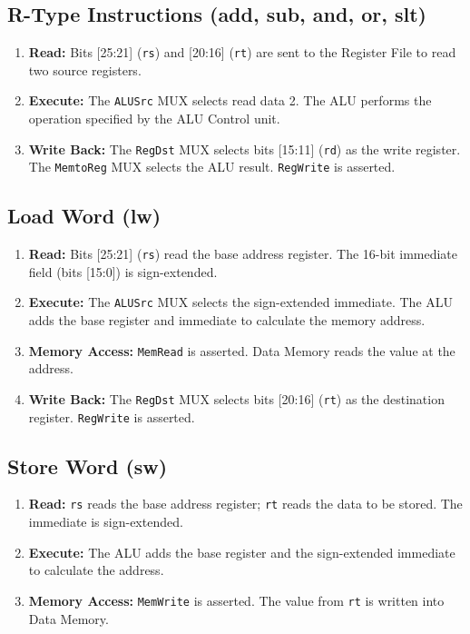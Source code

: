 \subsection{R-Type Instructions (add, sub, and, or, slt)}

\begin{enumerate}
    \item \textbf{Read:} Bits [25:21] (\texttt{rs}) and [20:16] (\texttt{rt}) are sent to the Register File to read two source registers.
    \item \textbf{Execute:} The \texttt{ALUSrc} MUX selects read data 2. The ALU performs the operation specified by the ALU Control unit.
    \item \textbf{Write Back:} The \texttt{RegDst} MUX selects bits [15:11] (\texttt{rd}) as the write register. The \texttt{MemtoReg} MUX selects the ALU result. \texttt{RegWrite} is asserted.
\end{enumerate}

\subsection{Load Word (lw)}

\begin{enumerate}
    \item \textbf{Read:} Bits [25:21] (\texttt{rs}) read the base address register. The 16-bit immediate field (bits [15:0]) is sign-extended.
    \item \textbf{Execute:} The \texttt{ALUSrc} MUX selects the sign-extended immediate. The ALU adds the base register and immediate to calculate the memory address.
    \item \textbf{Memory Access:} \texttt{MemRead} is asserted. Data Memory reads the value at the address.
    \item \textbf{Write Back:} The \texttt{RegDst} MUX selects bits [20:16] (\texttt{rt}) as the destination register. \texttt{RegWrite} is asserted.
\end{enumerate}

\subsection{Store Word (sw)}

\begin{enumerate}
    \item \textbf{Read:} \texttt{rs} reads the base address register; \texttt{rt} reads the data to be stored. The immediate is sign-extended.
    \item \textbf{Execute:} The ALU adds the base register and the sign-extended immediate to calculate the address.
    \item \textbf{Memory Access:} \texttt{MemWrite} is asserted. The value from \texttt{rt} is written into Data Memory.
\end{enumerate}

